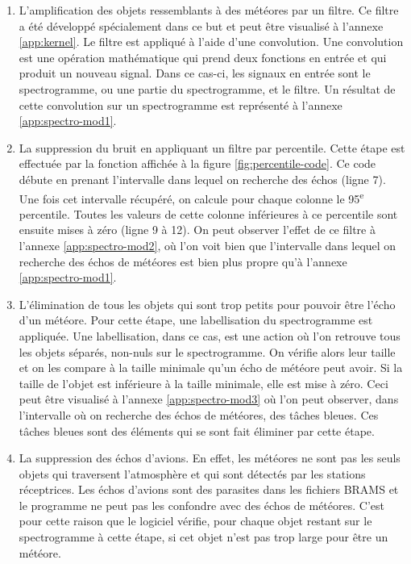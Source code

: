 \documentclass[11pt]{article}
\begin{document}
\begin{enumerate}
    \item L'amplification des objets ressemblants à des météores par un filtre.
          Ce filtre a été développé spécialement dans ce but et peut être visualisé à l'annexe \ref{app:kernel}.
          Le filtre est appliqué à l'aide d'une convolution.
          Une convolution est une opération mathématique qui prend deux fonctions en entrée et qui produit un nouveau signal.
          Dans ce cas-ci, les signaux en entrée sont le spectrogramme, ou une partie du spectrogramme, et le filtre.
          Un résultat de cette convolution sur un spectrogramme est représenté à l'annexe \ref{app:spectro-mod1}.
    \item La suppression du bruit en appliquant un filtre par percentile.
          Cette étape est effectuée par la fonction affichée à la figure \ref{fig:percentile-code}.
          Ce code débute en prenant l'intervalle dans lequel on recherche des échos (ligne 7).
          Une fois cet intervalle récupéré, on calcule pour chaque colonne le 95\textsuperscript{e} percentile.
          Toutes les valeurs de cette colonne inférieures à ce percentile sont ensuite mises à zéro (ligne 9 à 12).
          On peut observer l'effet de ce filtre à l'annexe \ref{app:spectro-mod2}, où l'on voit bien que l'intervalle dans lequel on recherche des échos de météores est bien plus propre qu'à l'annexe \ref{app:spectro-mod1}.
    \item L'élimination de tous les objets qui sont trop petits pour pouvoir être l'écho d'un météore.
          Pour cette étape, une labellisation du spectrogramme est appliquée.
          Une labellisation, dans ce cas, est une action où l'on retrouve tous les objets séparés, non-nuls sur le spectrogramme.
          On vérifie alors leur taille et on les compare à la taille minimale qu'un écho de météore peut avoir.
          Si la taille de l'objet est inférieure à la taille minimale, elle est mise à zéro.
          Ceci peut être visualisé à l'annexe \ref{app:spectro-mod3} où l'on peut observer, dans l'intervalle où on recherche des échos de météores, des tâches bleues.
          Ces tâches bleues sont des éléments qui se sont fait éliminer par cette étape.
    \item La suppression des échos d'avions.
          En effet, les météores ne sont pas les seuls objets qui traversent l'atmosphère et qui sont détectés par les stations réceptrices.
          Les échos d'avions sont des parasites dans les fichiers BRAMS et le programme ne peut pas les confondre avec des échos de météores.
          C'est pour cette raison que le logiciel vérifie, pour chaque objet restant sur le spectrogramme à cette étape, si cet objet n'est pas trop large pour être un météore.
\end{enumerate}
\end{document}

